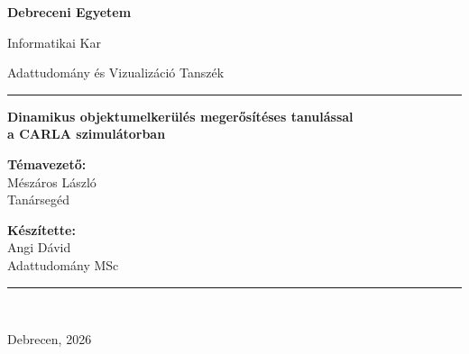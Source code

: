 \documentclass[a4paper,12pt,oneside]{article}
\newcommand{\dolgozatcim}{Dinamikus objektumelkerülés megerősítéses tanulással\\a CARLA szimulátorban}
\begin{document}
\begin{titlepage}
  \singlespacing
  \centering

  {\fontsize{14}{18}\selectfont\bfseries Debreceni Egyetem\par}
  \vspace{4pt}
  {\large Informatikai Kar\par}
  {\large Adattudomány és Vizualizáció Tanszék\par}
  \vspace{10pt}
  \rule{\textwidth}{0.6pt}

  \vspace{0.10\textheight}
  {\fontsize{16}{22}\selectfont\bfseries \dolgozatcim\par}
  \vspace{14pt}
  \vspace{22pt}
  {\normalsize\scshape \par}


  \begin{minipage}[t]{0.48\textwidth}
    \raggedright
    {\bfseries Témavezető:}\\[6pt]
    Mészáros László\\
    Tanársegéd 
  \end{minipage}%
  \hfill
  \begin{minipage}[t]{0.48\textwidth}
    \raggedleft
    {\bfseries Készítette:}\\[6pt]
    Angi Dávid\\
    Adattudomány MSc
  \end{minipage}


  \rule{\textwidth}{0.6pt}\\[8pt]
  {\large Debrecen, 2026\par}
\end{titlepage}
\setcounter{page}{2}

\tableofcontents
\newpage
\end{document}
